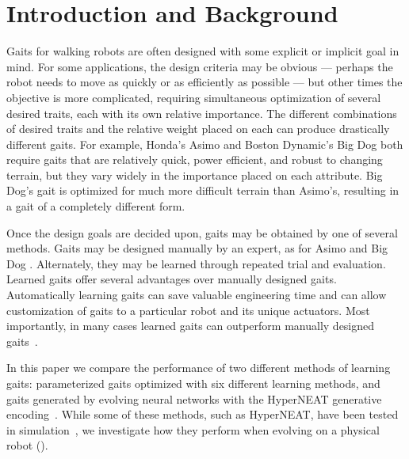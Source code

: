 \section{Introduction and Background}



Gaits for walking robots are often designed with some explicit or
implicit goal in mind.  For some applications, the design criteria may
be obvious --- perhaps the robot needs to move as quickly or as
efficiently as possible --- but other times the objective is more complicated,
requiring simultaneous optimization of several desired traits, each
with its own relative importance.  The different combinations of desired traits and the relative weight placed on each can produce drastically different gaits.    For example, Honda's Asimo
\cite{chestnutt2006footstep} and Boston Dynamic's Big Dog \cite{raibert2008bigdog} both require
gaits that are relatively quick, power efficient, and robust to
changing terrain, but they vary widely in the importance placed
on each attribute.  Big Dog's gait is optimized for much more difficult terrain than Asimo's, resulting in a gait of a completely different form.

Once the design goals are decided upon, gaits may be obtained by one
of several methods.  Gaits may be designed manually by an expert, as
for Asimo and Big Dog \cite{chestnutt2006footstep, raibert2008bigdog}.
Alternately, they may be learned through repeated trial and
evaluation.  Learned gaits offer several advantages over manually
designed gaits.  Automatically learning gaits can save valuable
engineering time and can allow customization of gaits to a particular
robot and its unique actuators.  Most importantly, in many cases
learned gaits can outperform manually designed
gaits~\cite{hornby2005autonomous, valsalam2008modular}.

In this paper we compare the performance of two different methods of
learning gaits: parameterized gaits optimized with six different
learning methods, and gaits generated by evolving neural networks with
the HyperNEAT generative encoding~\cite{stanley2009hypercube}. While
some of these methods, such as HyperNEAT, have been tested in
simulation~\cite{clune2009evolving, clune2011performance}, we
investigate how they perform when evolving on a physical robot
().

